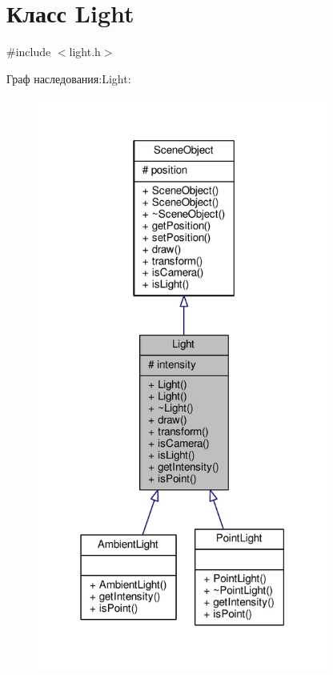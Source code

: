 \hypertarget{class_light}{}\section{Класс Light}
\label{class_light}


{\ttfamily \#include $<$light.\+h$>$}



Граф наследования\+:Light\+:
\nopagebreak
\begin{figure}[H]
\begin{center}
\leavevmode
\includegraphics[width=270pt]{dd/d00/class_light__inherit__graph}
\end{center}
\end{figure}


